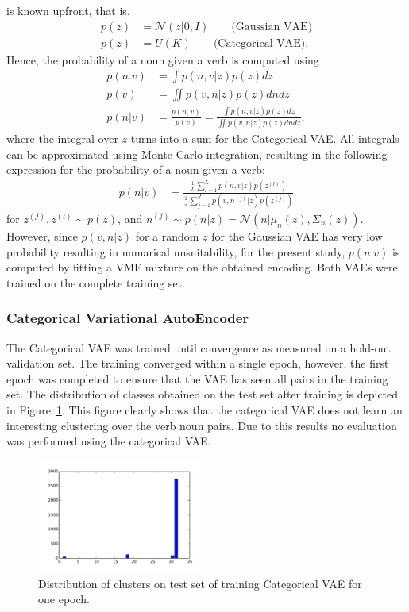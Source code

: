\documentclass[11pt]{scrartcl}
\begin{document}
is known upfront, that is,
\begin{align*}
  p(z) &= \mathcal{N}(z | 0, I) \qquad \text{(Gaussian VAE)} \\
  p(z) &= U(K) \qquad \text{(Categorical VAE)}.
\end{align*}
Hence, the probability of a noun given a verb is computed using
\begin{align*}
  p(n. v) &= \int p(n, v| z) p(z) dz \\
  p(v) &= \iint p(v, n | z) p(z) dn dz \\
  p(n|v) &= \frac{p(n, v)}{p(v)} = \frac{\int p(n, v| z) p(z) dz}{\iint p(v, n | z) p(z) dn dz},
 \end{align*}
where the integral over $z$ turns into a sum for the Categorical
VAE\@. All integrals can be approximated using Monte Carlo integration,
resulting in the following expression for the probability of a noun given a verb:
\begin{align*}
  p(n|v) &= \frac{\frac{1}{L} \sum_{l=1}^L p(n, v| z) p(z^{(l)})}{\frac{1}{J} \sum_{j=1}^J p(v, n^{(j)} | z) p(z^{(j)})}
\end{align*}
for $z^{(j)}, z^{(l)} \sim p(z)$, and $n^{(j)} \sim p(n | z) = \mathcal{N}(n| \mu_n(z), \Sigma_n(z))$. However,
since $p(v, n| z)$ for a random $z$ for the Gaussian VAE has very low
probability resulting in numarical unsuitability, for the present
study, $p(n|v)$ is computed by fitting a VMF mixture on the obtained
encoding.  Both VAEs were trained on the complete training set.

\subsubsection{Categorical Variational AutoEncoder}
The Categorical VAE was trained until convergence as measured on a
hold-out validation set. The training converged within a single epoch,
however, the first epoch was completed to ensure that the VAE has seen
all pairs in the training set. The distribution of classes obtained on
the test set after training is depicted in Figure~\ref{dist}. This
figure clearly shows that the categorical VAE does not learn an
interesting clustering over the verb noun pairs. Due to this results
no evaluation was performed using the categorical VAE.

\begin{figure}
  \centering
  \includegraphics[width=0.5\textwidth]{dist.pdf}
  \caption{Distribution of clusters on test set of training Categorical VAE for one epoch.}
  \label{dist}
 \end{figure}
\end{document}
